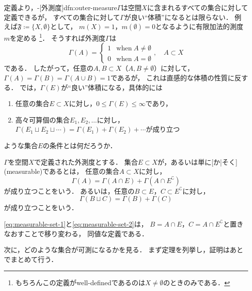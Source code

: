\documentclass[../sotsu.tex]{subfiles}
\begin{document}
定義より，-[外測度]{dfn:outer-measure}$Γ$は空間$X$に含まれるすべての集合に対して定義できるが，
すべての集合に対して$Γ$が良い``体積''になるとは限らない．
例えば$𝔉 \coloneq \{ X, \emptyset \}$として，
$m(X) = 1$，$m(\emptyset) = 0$となるように有限加法的測度$m$を定める%
\footnote{もちろんこの定義がwell-definedであるのは$X \neq \emptyset$のときのみである．}．
そうすれば外測度$Γ$は
\begin{equation*}
    Γ (A)  =  
    \begin{cases}
        1  &  \text{when} \;  A \neq \emptyset  \\
        0  &  \text{when} \;  A   =  \emptyset
    \end{cases}
    , 
    \quad 
    A \subset X
\end{equation*}
である．
したがって，任意の$A, B \subset X$（$A, B \neq \emptyset$）に対して，$Γ (A) = Γ (B) = Γ (A \cup B) = 1$であるが，
これは直感的な体積の性質に反する．
では，$Γ (E)$が``良い''体積になる，具体的には
\begin{enumerate}
    \item 任意の集合$E \subset X$に対し，$0 \leq Γ (E) \leq \infty$であり，
    \item 高々可算個の集合$E_1, E_2, \dotsc$に対し，
        $Γ (E_1 \sqcup E_2 \sqcup \dotsb) = Γ(E_1) + Γ(E_2) + \dotsb$が成り立つ
\end{enumerate}
ような集合$E$の条件とは何だろうか．

\begin{definition}
    \label{dfn:measurable-set}
    $Γ$を空間$X$で定義された外測度とする．
    集合$E \subset X$が，あるいは単に[か|そく](measurable)であるとは，
    任意の集合$A \subset X$に対し，
    \begin{equation}
        \label{eq:measurable-set-1}
        Γ (A) = Γ (A \cap E) + Γ (A \cap E^{\complement})
    \end{equation}
    が成り立つことをいう．
    あるいは，任意の$B \subset E$，$C \subset E^{\complement}$に対し，
    \begin{equation}
        \label{eq:measurable-set-2}
        Γ (B \sqcup C) = Γ (B) + Γ (C)
    \end{equation}
    が成り立つことをいう．
\end{definition}

\cref{eq:measurable-set-1}と\cref{eq:measurable-set-2}は，
$B = A \cap E$，$C = A \cap E^{\complement}$と置きなおすことで移り変わる，
同値な定義である．

次に，どのような集合が可測になるかを見る．
まず定理を列挙し，証明はあとでまとめて行う．
\end{document}
